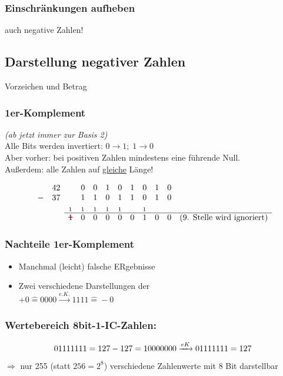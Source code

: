 \documentclass[10pt,a4paper]{scrartcl}
\newcommand\hcancel[2][black]{\setbox0=\hbox{$#2$}%
	\rlap{\raisebox{.45\ht0}{\textcolor{#1}{\rule{\wd0}{1pt}}}}#2}
\begin{document}
\subsubsection*{Einschränkungen aufheben}
\hspace*{2em}
auch negative Zahlen!
\\
\subsection{Darstellung negativer Zahlen}
 Vorzeichen und Betrag
\subsubsection{1er-Komplement}
	\textit{(ab jetzt immer zur Basis 2)}\\
	Alle Bits werden invertiert: $ 0 \rightarrow 1; \; 1\rightarrow 0 $\\
	Aber vorher: bei positiven Zahlen mindestens eine führende Null.\\
	Außerdem: alle Zahlen auf \underline{gleiche} Länge!

$$
\begin{array}{rc}
	& 42 \\
 -  & 37 \\
    & \\
    &
\end{array}
\begin{array}{cccccccccl}
       & 0 & 0 & 1 & 0 & 1 & 0 & 1 & 0 &\\
       & 1 & 1 & 0 & 1 & 1 & 0 & 1 & 0 &\\
 _1 & _1 & _1 & _1 & _1 &     & _1 &    & &\\ \hline
\hcancel[red]{1}  & 0 & 0 & 0 & 0 & 0 & 1 & 0 & 0 & \text{(9. Stelle wird ignoriert)}

\end{array}
$$

\subsubsection*{Nachteile 1er-Komplement}
\begin{itemize}
	\item Manchmal (leicht) falsche ERgebnisse
	\item Zwei verschiedene Darstellungen der \grqq \\
	$  +0 \hat{=} 0000 \xrightarrow{e.K.} 1111 \hat{=} -0 $
\end{itemize}
\subsubsection*{Wertebereich 8bit-1-IC-Zahlen:}
$$
01111111 = 127 \\
-127 = 10000000 \xrightarrow{eK} 01111111 = 127
$$
$\Rightarrow$ nur 255 (statt $ 256 = 2^8 $) verschiedene Zahlenwerte mit 8 Bit darstellbar
\end{document}
